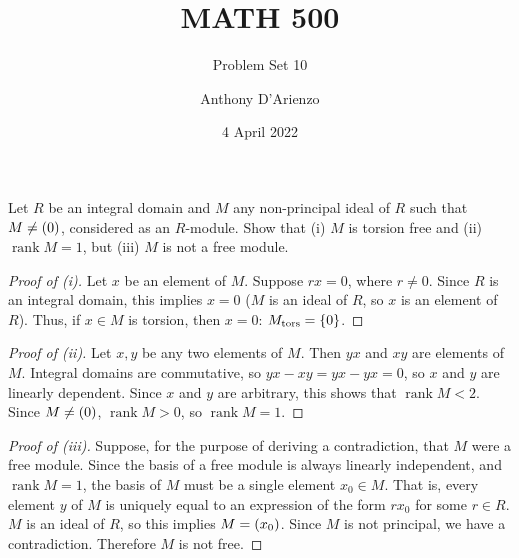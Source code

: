 \documentclass{./typewriter-math}
\title{MATH 500}
\subtitle{Problem Set 10}
\author{Anthony D'Arienzo}
\date{4 April 2022}
\DeclareMathOperator\rank{rank}
\newcommand\tors{\text{tors}}
\begin{document}
	
	\makehomeworktitle%

	\begin{exercise}[(DF 12.1.6)]
		Let \(R\) be an integral domain and \(M\) any non-principal ideal of \(R\)
		such that \(M \neq {\left(0\right)}\), considered as an \(R\)-module. Show that
		(i) \(M\) is torsion free and (ii) \(\rank M = 1\), but (iii) \(M\) is not
		a free module.

		\begin{proof}[Proof of (i)]
			Let \(x\) be an element of \(M\). Suppose \(r x = 0\), where \(r \neq
			0\). Since \(R\) is an integral domain, this implies \(x = 0\) (\(M\) is
			an ideal of \(R\), so \(x\) is an element of \(R\)). Thus, if \(x \in M\)
			is torsion, then \(x = 0\): \(M_\tors = \bwrap{0}\).
		\end{proof}

		\begin{proof}[Proof of (ii)]
			Let \(x,y\) be any two elements of \(M\). Then \(yx\) and \(xy\) are
			elements of \(M\). Integral domains are commutative, so \(yx - xy = yx -
			yx = 0\), so \(x\) and \(y\) are linearly dependent. Since \(x\) and
			\(y\) are arbitrary, this shows that \(\rank M < 2\). Since \(M \neq
			{\left(0\right)}\), \(\rank M > 0\), so \(\rank M = 1\).
		\end{proof}

		\begin{proof}[Proof of (iii)]
			Suppose, for the purpose of deriving a contradiction, that \(M\) were a
			free module. Since the basis of a free module is always linearly
			independent, and \(\rank M = 1\), the basis of \(M\) must be a single
			element \(x_0 \in M\). That is, every element \(y\) of \(M\) is uniquely
			equal to an expression of the form \(r x_0\) for some \(r \in R\). \(M\)
			is an ideal of \(R\), so this implies \(M = {\left(x_0\right)}\). Since \(M\) is
			not principal, we have a contradiction. Therefore \(M\) is not free.
		\end{proof}

	\end{exercise}
\end{document}
